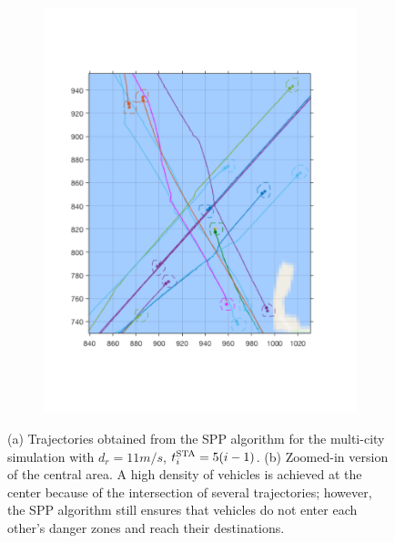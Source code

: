 \begin{figure}[!htb]
\begin{subfigure}{0.5\columnwidth}
  \includegraphics[width=\columnwidth]{figs/bayArea_d11sep5_zoomed}
  \subcaption{}
  \label{fig:bayArea_d11sep5_zoomed}
\end{subfigure}%
  \caption{(a) Trajectories obtained from the SPP algorithm for the multi-city simulation with $d_r = 11m/s$, $t^\text{STA}_i = 5(i-1)$. (b) Zoomed-in version of the central area. A high density of vehicles is achieved at the center because of the intersection of several trajectories; however, the SPP algorithm still ensures that vehicles do not enter each other's danger zones and reach their destinations.} 
  \label{fig:bayArea_d11sep5_all}
\end{figure}

